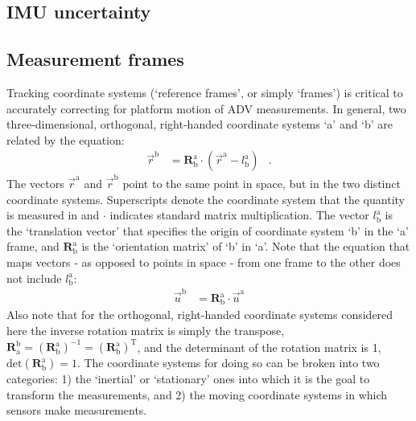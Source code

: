 \documentclass[twocol]{ametsoc}
\begin{document}
\acknowledgments


\clearpage %

\appendix


\def\Amat\ensuremath{}

\subsection{IMU uncertainty}\label{apdx:imu-uncertainty}

\subsection{Measurement frames}\label{apdx:coord-sys:meas}\label{apdx:coord-sys}

\def\a{\ensuremath{\mathrm{a}}}
\def\b{\ensuremath{\mathrm{b}}}
\def\lab{\ensuremath{l_\b^\a}}
\def\xa{\ensuremath{\vec{r}^\a}}
\def\xb{\ensuremath{\vec{r}^\b}}
\def\Rba{\ensuremath{\mathbf{R}^\a_\b}}

Tracking coordinate systems (`reference frames', or simply `frames') is critical to accurately correcting for platform motion of ADV measurements. In general, two three-dimensional, orthogonal, right-handed coordinate systems `a' and `b' are related by the equation:
\begin{align*}
  \xb &= \Rba \cdot (\xa - \lab) & .
\end{align*}
The vectors $\xa$ and $\xb$ point to the same point in space, but in the two distinct coordinate systems.  Superscripts denote the coordinate system that the quantity is measured in and $\cdot$ indicates standard matrix multiplication.  The vector $\lab$ is the `translation vector' that specifies the origin of coordinate system `b' in the `a' frame, and $\mathbf{R}^\mathrm{a}_\mathrm{b}$ is the `orientation matrix' of `b' in `a'. Note that the equation that maps vectors - as opposed to points in space - from one frame to the other does not include $\lab$:
\begin{align}
  \vec{u}^\mathrm{b} & = \Rba \cdot \vec{u}^\mathrm{a}
\end{align}
Also note that for the orthogonal, right-handed coordinate systems considered here the inverse rotation matrix is simply the transpose, $\mathbf{R}^{\mathrm{b}}_{\mathrm{a}}  = (\Rba)^{-1} = (\Rba)^\mathrm{T} $, and the determinant of the rotation matrix is 1, $\mathrm{det}(\Rba ) = 1$.
The coordinate systems for doing so can be broken into two categories: 1) the `inertial' or `stationary' ones into which it is the goal to transform the measurements, and 2) the moving coordinate systems in which sensors make measurements. 
\end{document}
